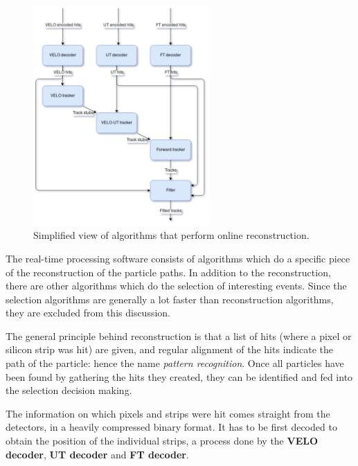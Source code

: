 \documentclass[12pt]{article}
\begin{document}
\begin{figure}[H]
	\begin{center}
		\includegraphics[width=0.6\textwidth]{algorithms_brunel}
	\end{center}
	\caption{Simplified view of algorithms that perform online reconstruction.}
	\label{fig_algorithms_brunel}
\end{figure}

The real-time processing software consists of algorithms which do a specific piece of the reconstruction of the particle paths. In addition to the reconstruction, there are other algorithms which do the selection of interesting events. Since the selection algorithms are generally a lot faster than reconstruction algorithms, they are excluded from this discussion.

The general principle behind reconstruction is that a list of hits (where a pixel or silicon strip was hit) are given, and regular alignment of the hits indicate the path of the particle: hence the name \textit{pattern recognition}. Once all particles have been found by gathering the hits they created, they can be identified and fed into the selection decision making.

The information on which pixels and strips were hit comes straight from the detectors, in a heavily compressed binary format. It has to be first decoded to obtain the position of the individual strips, a process done by the \textbf{VELO decoder}, \textbf{UT decoder} and \textbf{FT decoder}.
\end{document}
